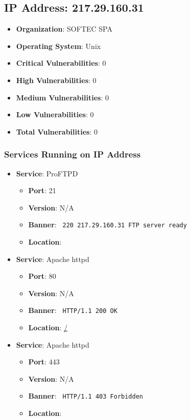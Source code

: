 \documentclass{article}
\begin{document}
\clearpage



\subsection*{IP Address: 217.29.160.31}

\begin{itemize}
    \item \textbf{Organization}: SOFTEC SPA
    \item \textbf{Operating System}:  Unix 
    \item \textbf{Critical Vulnerabilities}: 0
    \item \textbf{High Vulnerabilities}: 0
    \item \textbf{Medium Vulnerabilities}: 0
    \item \textbf{Low Vulnerabilities}: 0
    \item \textbf{Total Vulnerabilities}: 0
\end{itemize}

\subsubsection*{Services Running on IP Address}

\begin{itemize}
    
        \item \textbf{Service}: ProFTPD
        \begin{itemize}
            \item \textbf{Port}: 21
            \item \textbf{Version}:  N/A 
            \item \textbf{Banner}: \texttt{ 220 217.29.160.31 FTP server ready
 }
            \item \textbf{Location}: \href{  }{  }
        \end{itemize}
    
        \item \textbf{Service}: Apache httpd
        \begin{itemize}
            \item \textbf{Port}: 80
            \item \textbf{Version}:  N/A 
            \item \textbf{Banner}: \texttt{ HTTP/1.1 200 OK
 }
            \item \textbf{Location}: \href{ / }{ / }
        \end{itemize}
    
        \item \textbf{Service}: Apache httpd
        \begin{itemize}
            \item \textbf{Port}: 443
            \item \textbf{Version}:  N/A 
            \item \textbf{Banner}: \texttt{ HTTP/1.1 403 Forbidden
 }
            \item \textbf{Location}: \href{  }{  }
        \end{itemize}
    
\end{itemize}
\end{document}
